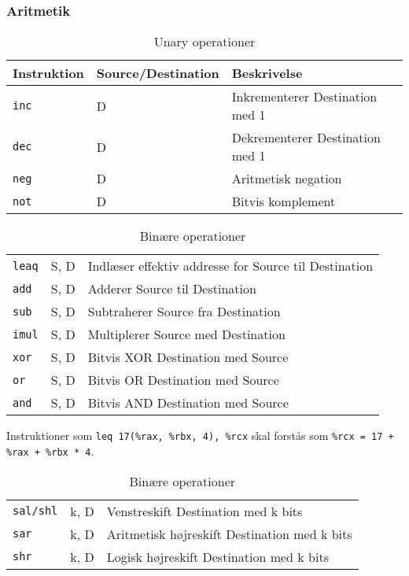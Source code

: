 \subsubsection{Aritmetik}
\begin{table}[h]
    \centering
    \begin{tabular}{ll|l}
        Instruktion&Source/Destination&Beskrivelse\\\hline
        \verb|inc|&D&Inkrementerer Destination med 1\\
        \verb|dec|&D&Dekrementerer Destination med 1\\
        \verb|neg|&D&Aritmetisk negation\\
        \verb|not|&D&Bitvis komplement
    \end{tabular}
    \caption{Unary operationer}
\end{table}
\begin{table}[h]
    \centering
    \begin{tabular}{ll|l}
        \verb|leaq|&S, D&Indlæser effektiv addresse for Source til Destination\\
        \verb|add|&S, D&Adderer Source til Destination\\
        \verb|sub|&S, D&Subtraherer Source fra Destination\\
        \verb|imul|&S, D&Multiplerer Source med Destination\\
        \verb|xor|&S, D&Bitvis XOR Destination med Source\\
        \verb|or|&S, D&Bitvis OR Destination med Source\\
        \verb|and|&S, D&Bitvis AND Destination med Source
    \end{tabular}
    \caption{Binære operationer}
\end{table}
Instruktioner som \verb|leq 17(%rax, %rbx, 4), %rcx| skal forstås som \verb|%rcx = 17 + %rax + %rbx * 4|.
\begin{table}[h]
    \centering
    \begin{tabular}{ll|l}
        \verb|sal/shl|&k, D&Venstreskift Destination med k bits\\
        \verb|sar|&k, D&Aritmetisk højreskift Destination med k bits\\
        \verb|shr|&k, D&Logisk højreskift Destination med k bits
    \end{tabular}
    \caption{Binære operationer}
\end{table}
